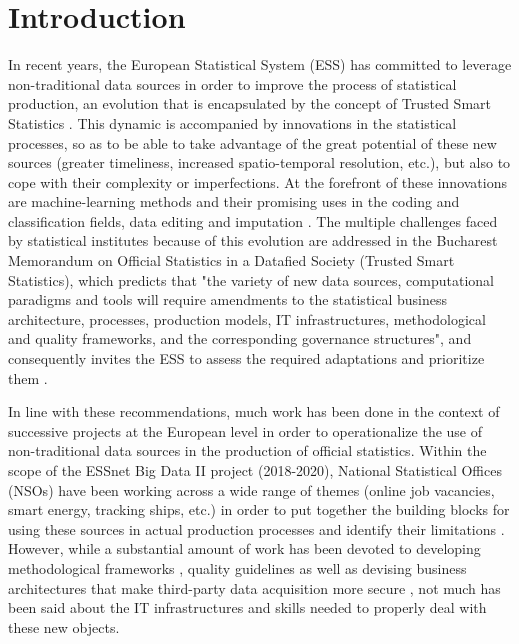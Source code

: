 \section{Introduction}
\label{sec:introduction}

In recent years, the European Statistical System (ESS) has committed to leverage non-traditional data sources in order to improve the process of statistical production, an evolution that is encapsulated by the concept of Trusted Smart Statistics \cite{ricciato2019trusted}. This dynamic is accompanied by innovations in the statistical processes, so as to be able to take advantage of the great potential of these new sources (greater timeliness, increased spatio-temporal resolution, etc.), but also to cope with their complexity or imperfections. At the forefront of these innovations are machine-learning methods and their promising uses in the coding and classification fields, data editing and imputation \cite{gjaltema2022high}. The multiple challenges faced by statistical institutes because of this evolution are addressed in the Bucharest Memorandum on Official Statistics in a Datafied Society (Trusted Smart Statistics), which predicts that "the variety of new data sources, computational paradigms and tools will require amendments to the statistical business architecture, processes, production models, IT infrastructures, methodological and quality frameworks, and the corresponding governance structures", and consequently invites the ESS to assess the required adaptations and prioritize them \cite{bucharest2018}.

In line with these recommendations, much work has been done in the context of successive projects at the European level in order to operationalize the use of non-traditional data sources in the production of official statistics. Within the scope of the ESSnet Big Data II project (2018-2020), National Statistical Offices (NSOs) have been working across a wide range of themes (online job vacancies, smart energy, tracking ships, etc.) in order to put together the building blocks for using these sources in actual production processes and identify their limitations \cite{essnetbigdata2}. However, while a substantial amount of work has been devoted to developing methodological frameworks \cite{descy2019towards, salgado2020mobile}, quality guidelines \cite{kowarik2022quality} as well as devising business architectures that make third-party data acquisition more secure \cite{ricciato2018processing}, not much has been said about the IT infrastructures and skills needed to properly deal with these new objects.

